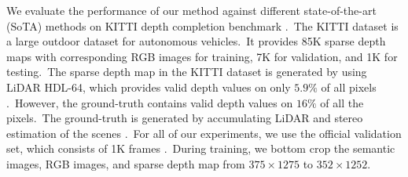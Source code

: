 \documentclass{ieeeaccess}
\begin{document}
We evaluate the performance of our method against different state-of-the-art (SoTA) methods on KITTI depth completion benchmark \cite{KITTI, kitti_2}.~The KITTI dataset is a large outdoor dataset for autonomous vehicles.~It provides 85K sparse depth maps with corresponding RGB images for training, 7K for validation, and 1K for testing.~The sparse depth map in the KITTI dataset is generated by using LiDAR HDL-64, which provides valid depth values on only $5.9 \%$ of all pixels \cite{KITTI, kitti_2}.~However, the ground-truth contains valid depth values on $16 \%$ of all the pixels.~The ground-truth is generated by accumulating LiDAR and stereo estimation of the scenes \cite{KITTI, kitti_2}.~For all of our experiments, we use the official validation set, which consists of 1K frames  \cite{KITTI, kitti_2}.~During training, we bottom crop the semantic images, RGB images, and sparse depth map from $375 \times 1275$ to $352 \times 1252$. 
\end{document}
